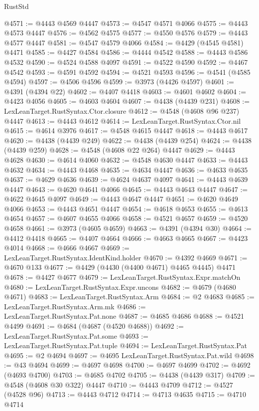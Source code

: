 \begin{lexlean}{RustStd}
\begin{coremodule}
{\begin{coremodule}
{{{{{{{{{{{{{{{{{{{{{{{{{{{{{{{{{{{{{{{{{{{{{{{{{{{{{{{{{{{{{{{{{{{{@4571 := @4443 @4569 @4447
@4573 := @4547 @4571 @4066
@4575 := @4443 @4573 @4447
@4576 := @4562 @4575
@4577 := @4550 @4576
@4579 := @4443 @4577 @4447
@4581 := @4547 @4579 @4066
@4584 := @4429 (@4545 @4581) @4471
@4585 := @4427 @4584
@4586 := @4444 @4542
@4588 := @4443 @4586 @4532
@4590 := @4524 @4588 @4097
@4591 := @4522 @4590
@4592 := @4467 @4542
@4593 := @4591 @4592
@4594 := @4521 @4593
@4596 := @4541 (@4585 @4594)
@4597 := @4506 @4596
@4599 := @3973 (@4426 @4597)
@4601 := @4391 (@4394 @22)
@4602 := @4407 @4418
@4603 := @4601 @4602
@4604 := @4423 @4056
@4605 := @4603 @4604
@4607 := @4438 (@4439 @231)
@4608 := LexLeanTarget.RustSyntax.Ctor.closure
@4612 := @4548 (@4608 @96 @237) @4447
@4613 := @4443 @4612
@4614 := LexLeanTarget.RustSyntax.Ctor.nil
@4615 := @4614 @3976
@4617 := @4548 @4615 @4447
@4618 := @4443 @4617
@4620 := @4438 (@4439 @249)
@4622 := @4438 (@4439 @254)
@4624 := @4438 (@4439 @259)
@4628 := @4548 (@4608 @22 @264) @4447
@4629 := @4443 @4628
@4630 := @4614 @4060
@4632 := @4548 @4630 @4447
@4633 := @4443 @4632
@4634 := @4443 @4468
@4635 := @4634 @4447
@4636 := @4633 @4635
@4637 := @4629 @4636
@4639 := @4624 @4637 @4097
@4641 := @4443 @4639 @4447
@4643 := @4620 @4641 @4066
@4645 := @4443 @4643 @4447
@4647 := @4622 @4645 @4097
@4649 := @4443 @4647 @4447
@4651 := @4620 @4649 @4066
@4653 := @4443 @4651 @4447
@4654 := @4618 @4653
@4655 := @4613 @4654
@4657 := @4607 @4655 @4066
@4658 := @4521 @4657
@4659 := @4520 @4658
@4661 := @3973 (@4605 @4659)
@4663 := @4391 (@4394 @30)
@4664 := @4412 @4418
@4665 := @4407 @4664
@4666 := @4663 @4665
@4667 := @4423 @4014
@4668 := @4666 @4667
@4669 := LexLeanTarget.RustSyntax.IdentKind.holder
@4670 := @4392 @4669
@4671 := @4670 @133
@4677 := @4429 (@4430 (@4400 @4671) @4465 @4445) @4471
@4678 := @4427 @4677
@4679 := LexLeanTarget.RustSyntax.Expr.matchOn
@4680 := LexLeanTarget.RustSyntax.Expr.uncons
@4682 := @4679 (@4680 @4671)
@4683 := LexLeanTarget.RustSyntax.Arm
@4684 := @2 @4683
@4685 := LexLeanTarget.RustSyntax.Arm.mk
@4686 := LexLeanTarget.RustSyntax.Pat.none
@4687 := @4685 @4686
@4688 := @4521 @4499
@4691 := @4684 (@4687 (@4520 @4688))
@4692 := LexLeanTarget.RustSyntax.Pat.some
@4693 := LexLeanTarget.RustSyntax.Pat.tuple
@4694 := LexLeanTarget.RustSyntax.Pat
@4695 := @2 @4694
@4697 := @4695 LexLeanTarget.RustSyntax.Pat.wild
@4698 := @43 @4694
@4699 := @4697 @4698
@4700 := @4697 @4699
@4702 := @4692 (@4693 @4700)
@4703 := @4685 @4702
@4705 := @4438 (@4439 @317)
@4709 := @4548 (@4608 @30 @322) @4447
@4710 := @4443 @4709
@4712 := @4527 (@4528 @96)
@4713 := @4443 @4712
@4714 := @4713 @4635
@4715 := @4710 @4714
}}}}}}}}}}}}}}}}}}}}}}}}}}}}}}}}}}}}}}}}}}}}}}}}}}}}}}}}}}}}}}}}}}}}
\end{coremodule}}
\end{coremodule}
\end{lexlean}

